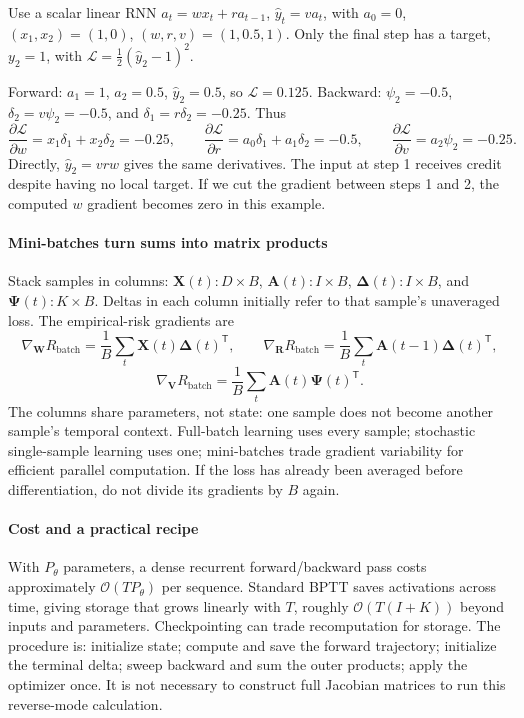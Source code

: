 \documentclass[11pt, oneside]{book}
\newcommand{\T}{^{\mathsf{T}}}           %
\newcommand{\loss}{\mathcal{L}}          %
\newcommand{\params}{\boldsymbol{\theta}}   %
\newcommand{\bigO}[1]{\mathcal{O}\!\left(#1\right)}
\begin{document}
\begin{exbox}[title={A complete two-step gradient calculation}]
Use a scalar linear RNN $a_t=wx_t+ra_{t-1}$, $\widehat y_t=va_t$, with $a_0=0$, $(x_1,x_2)=(1,0)$, $(w,r,v)=(1,0.5,1)$. Only the final step has a target, $y_2=1$, with $\loss=\tfrac12(\widehat y_2-1)^2$.

Forward: $a_1=1$, $a_2=0.5$, $\widehat y_2=0.5$, so $\loss=0.125$.
Backward: $\psi_2=-0.5$, $\delta_2=v\psi_2=-0.5$, and $\delta_1=r\delta_2=-0.25$. Thus
\[
 \frac{\partial\loss}{\partial w}=x_1\delta_1+x_2\delta_2=-0.25,\qquad
 \frac{\partial\loss}{\partial r}=a_0\delta_1+a_1\delta_2=-0.5,\qquad
 \frac{\partial\loss}{\partial v}=a_2\psi_2=-0.25.
\]
Directly, $\widehat y_2=vrw$ gives the same derivatives. The input at step 1 receives credit despite having no local target. If we cut the gradient between steps 1 and 2, the computed $w$ gradient becomes zero in this example.
\end{exbox}

\paragraph{Mini-batches turn sums into matrix products} Stack samples in columns: $\mathbf{X}(t):D\times B$, $\mathbf{A}(t):I\times B$, $\boldsymbol{\Delta}(t):I\times B$, and $\boldsymbol{\Psi}(t):K\times B$. Deltas in each column initially refer to that sample's unaveraged loss. The empirical-risk gradients are
\[
 \nabla_{\mathbf{W}}R_{\mathrm{batch}}=\frac1B\sum_t\mathbf{X}(t)\boldsymbol{\Delta}(t)\T,
 \qquad
 \nabla_{\mathbf{R}}R_{\mathrm{batch}}=\frac1B\sum_t\mathbf{A}(t-1)\boldsymbol{\Delta}(t)\T,
\]
\[
 \nabla_{\mathbf{V}}R_{\mathrm{batch}}=\frac1B\sum_t\mathbf{A}(t)\boldsymbol{\Psi}(t)\T.
\]
The columns share parameters, not state: one sample does not become another sample's temporal context. Full-batch learning uses every sample; stochastic single-sample learning uses one; mini-batches trade gradient variability for efficient parallel computation. If the loss has already been averaged before differentiation, do not divide its gradients by $B$ again.

\paragraph{Cost and a practical recipe} With $P_\theta$ parameters, a dense recurrent forward/backward pass costs approximately $\bigO{TP_\theta}$ per sequence. Standard BPTT saves activations across time, giving storage that grows linearly with $T$, roughly $\bigO{T(I+K)}$ beyond inputs and parameters. Checkpointing can trade recomputation for storage. The procedure is: initialize state; compute and save the forward trajectory; initialize the terminal delta; sweep backward and sum the outer products; apply the optimizer once. It is not necessary to construct full Jacobian matrices to run this reverse-mode calculation.
\end{document}
